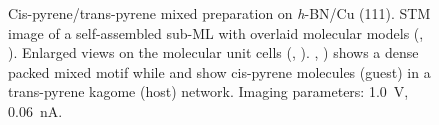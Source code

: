 \begin{figure}[]\centering	
	\caption{Cis-pyrene/trans-pyrene mixed preparation on \textit{h}-BN/Cu (111). STM image of a self-assembled sub-ML with overlaid molecular models (, ). Enlarged views on the molecular unit cells (, ). , ) shows a dense packed mixed motif while  and  show cis-pyrene molecules (guest) in a trans-pyrene kagome (host) network. Imaging parameters: \SI{1.0}{\volt}, \SI{0.06}{\nano \ampere}.
	}
	\label{fig:pyene-S10}
\end{figure}

